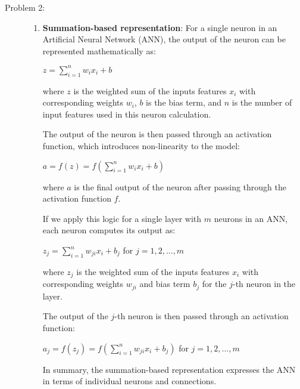\documentclass[12pt]{article}
\begin{document}
\begin{description}
  \pagebreak
  
  \item[Problem 2:] %

  \begin{enumerate}
    \item \textbf{Summation-based representation}:
    For a single neuron in an Artificial Neural Network (ANN), the output of the neuron can be represented mathematically as:

    \begin{center}
      $\displaystyle{z = \sum_{i=1}^{n} w_i x_i + b}$
    \end{center}

    where $z$ is the weighted sum of the inputs features $x_i$ with corresponding weights $w_i$, $b$ is the bias term, and $n$ is the number of input features 
    used in this neuron calculation.

    The output of the neuron is then passed through an activation function, which introduces non-linearity to the model:

    \begin{center}
      $\displaystyle{a = f(z) = f(\sum_{i=1}^{n} w_i x_i + b)}$
    \end{center}
    
    where $a$ is the final output of the neuron after passing through the activation function $f$.

    If we apply this logic for a single layer with $m$ neurons in an ANN, each neuron computes its output as:

    \begin{center}
      $\displaystyle{z_j = \sum_{i=1}^{n} w_{ji} x_i + b_j}$ for $j = 1, 2, ..., m$
    \end{center}

    where $z_j$ is the weighted sum of the inputs features $x_i$ with corresponding weights $w_{ji}$ and bias term $b_j$ for the $j$-th neuron in the layer.

    The output of the $j$-th neuron is then passed through an activation function:

    \begin{center}
      $\displaystyle{a_j = f(z_j) = f(\sum_{i=1}^{n} w_{ji} x_i + b_j)}$ for $j = 1, 2, ..., m$
    \end{center}

    In summary, the summation-based representation expresses the ANN in terms of individual neurons and connections. 


\end{enumerate}
\end{description}
\end{document}
